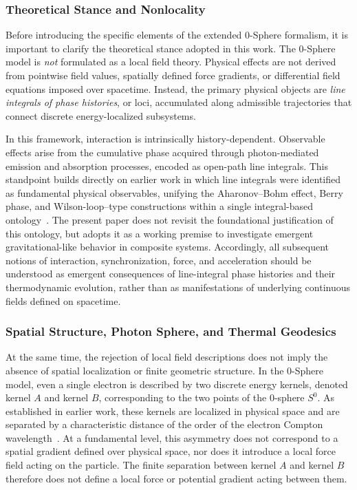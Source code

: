 \documentclass[%
 reprint,
 amsmath,amssymb,
 aps,
 prb,
]{revtex4-2}
\numberwithin{equation}{section}
\begin{document}
\subsubsection{Theoretical Stance and Nonlocality}

Before introducing the specific elements of the extended 0-Sphere formalism, it is important to clarify the theoretical stance adopted in this work. The 0-Sphere model is \emph{not} formulated as a local field theory. Physical effects are not derived from pointwise field values, spatially defined force gradients, or differential field equations imposed over spacetime. Instead, the primary physical objects are \emph{line integrals of phase histories}, or loci, accumulated along admissible trajectories that connect discrete energy-localized subsystems.

In this framework, interaction is intrinsically history-dependent. Observable effects arise from the cumulative phase acquired through photon-mediated emission and absorption processes, encoded as open-path line integrals. This standpoint builds directly on earlier work in which line integrals were identified as fundamental physical observables, unifying the Aharonov--Bohm effect, Berry phase, and Wilson-loop--type constructions within a single integral-based ontology~\cite{Hanamura2026Trilogy3}. The present paper does not revisit the foundational justification of this ontology, but adopts it as a working premise to investigate emergent gravitational-like behavior in composite systems. Accordingly, all subsequent notions of interaction, synchronization, force, and acceleration should be understood as emergent consequences of line-integral phase histories and their thermodynamic evolution, rather than as manifestations of underlying continuous fields defined on spacetime.

\subsubsection{Spatial Structure, Photon Sphere, and Thermal Geodesics}

At the same time, the rejection of local field descriptions does not imply the absence of spatial localization or finite geometric structure. In the 0-Sphere model, even a single electron is described by two discrete energy kernels, denoted kernel $A$ and kernel $B$, corresponding to the two points of the 0-sphere $S^{0}$. As established in earlier work, these kernels are localized in physical space and are separated by a characteristic distance of the order of the electron Compton wavelength~\cite{Hanamura2026Trilogy3}. At a fundamental level, this asymmetry does not correspond to a spatial gradient defined over physical space, nor does it introduce a local force field acting on the particle. The finite separation between kernel $A$ and kernel $B$ therefore does not define a local force or potential gradient acting between them.
\end{document}

